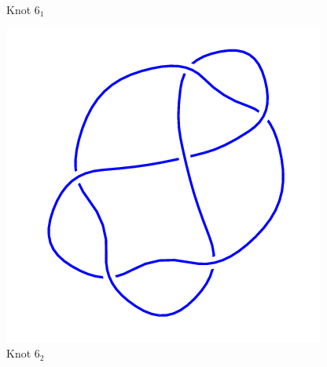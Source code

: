 \documentclass{article}
\begin{document}
\begin{figure}[!htb]
\caption{Knot $6_1$}
\endminipage\hfill
{}
\includegraphics[width=\linewidth]{6_2.png}
\caption{Knot $6_2$}
\endminipage\hfill
\end{figure}
\end{document}
